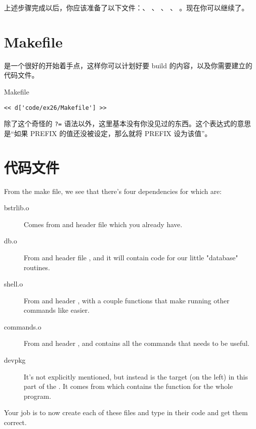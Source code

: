上述步骤完成以后，你应该准备了以下文件：、 、
、 、 。现在你可以继续了。

\section{Makefile}

 是一个很好的开始着手点，这样你可以计划好要 build 的内容，以及你需要建立的
代码文件。

\begin{code}{Makefile}
\begin{lstlisting}
<< d['code/ex26/Makefile'] >>
\end{lstlisting}
\end{code}

除了这个奇怪的 \verb|?=| 语法以外，这里基本没有你没见过的东西。这个表达式的意思是“如果 PREFIX 
的值还没被设定，那么就将 PREFIX 设为该值”。

\section{代码文件}

From the make file, we see that there's four dependencies for 
which are:

\begin{description}
\item[bstrlib.o] Comes from  and header file  which
    you already have.
\item[db.o] From  and header file , and it
    will contain code for our little "database" routines.
\item[shell.o] From  and header , with a couple
    functions that make running other commands like  easier.
\item[commands.o] From  and header , and
    contains all the commands that  needs to be useful.
\item[devpkg] It's not explicitly mentioned, but instead is the target
    (on the left) in this part of the . It comes from
     which contains the  function for the whole
    program.
\end{description}

Your job is to now create each of these files and type in their code
and get them correct.

